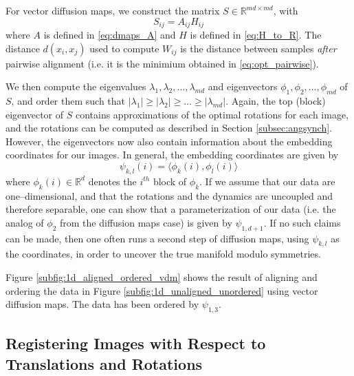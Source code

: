 \documentclass[11pt]{article}
\begin{document}
For vector diffusion maps, we construct the matrix $S \in \mathbb{R}^{md \times md}$, with
\begin{equation}
	S_{ij} = A_{ij} H_{ij}
\end{equation}
%
where $A$ is defined in \eqref{eq:dmaps_A} and $H$ is defined in \eqref{eq:H_to_R}.
%
The distance $d(x_i, x_j)$ used to compute $W_{ij}$ is the distance between samples {\em after} pairwise alignment (i.e. it is the minimium obtained in \eqref{eq:opt_pairwise}). 

We then compute the eigenvalues $\lambda_1, \lambda_2, \dots, \lambda_{md}$ and eigenvectors $\phi_1, \phi_2, \dots, \phi_{md}$ of $S$, and order them such that $|\lambda_1| \ge |\lambda_2| \ge \dots \ge |\lambda_{md}|$.
%
Again, the top (block) eigenvector of $S$ contains approximations of the optimal rotations for each image, and the rotations can be computed as described in Section \ref{subsec:angsynch}.
%
However, the eigenvectors now also contain information about the embedding coordinates for our images.
%
In general, the embedding coordinates are given by 
\begin{equation}
\psi_{k,l} (i) = \langle \phi_k(i), \phi_l(i) \rangle
\end{equation}
where $\phi_k(i) \in \mathbb{R}^d$ denotes the $i^{th}$ block of $\phi_k$.
%
If we assume that our data are one--dimensional, and that the rotations and the dynamics are uncoupled and therefore separable, one can show that a parameterization of our data (i.e. the analog of $\phi_2$ from the diffusion maps case) is given by $\psi_{1,d+1}$.
%
If no such claims can be made, then one often runs a second step of diffusion maps, using $\psi_{k,l}$ as the coordinates, in order to uncover the true manifold modulo symmetries. 

Figure \ref{subfig:1d_aligned_ordered_vdm} shows the result of aligning and ordering the data in Figure \ref{subfig:1d_unaligned_unordered} using vector diffusion maps. 
%
The data has been ordered by $\psi_{1, 3}$. 

\subsection{Registering Images with Respect to Translations and Rotations} \label{subsec:trans_rot_register}
\end{document}

